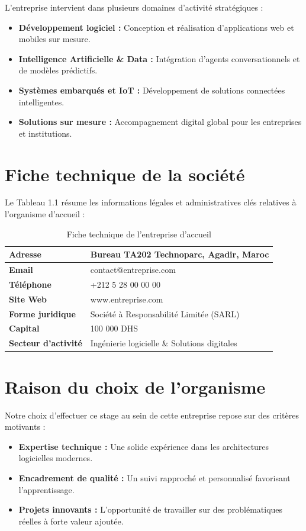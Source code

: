 \documentclass[12pt, a4paper, oneside]{report}
\begin{document}
L’entreprise intervient dans plusieurs domaines d'activité stratégiques :
\begin{itemize}
  \item \textbf{Développement logiciel :} Conception et réalisation d’applications web et mobiles sur mesure.
  \item \textbf{Intelligence Artificielle \& Data :} Intégration d'agents conversationnels et de modèles prédictifs.
  \item \textbf{Systèmes embarqués et IoT :} Développement de solutions connectées intelligentes.
  \item \textbf{Solutions sur mesure :} Accompagnement digital global pour les entreprises et institutions.
\end{itemize}

\section{Fiche technique de la société}
Le Tableau 1.1 résume les informations légales et administratives clés relatives à l'organisme d'accueil :

\begin{table}[H]
\centering
\caption{Fiche technique de l'entreprise d'accueil}
\renewcommand{\arraystretch}{1.3}
\begin{tabular}{|l|l|}
\hline
\textbf{Adresse} & Bureau TA202 Technoparc, Agadir, Maroc \\ \hline
\textbf{Email} & contact@entreprise.com \\ \hline
\textbf{Téléphone} & +212 5 28 00 00 00 \\ \hline
\textbf{Site Web} & www.entreprise.com \\ \hline
\textbf{Forme juridique} & Société à Responsabilité Limitée (SARL) \\ \hline
\textbf{Capital} & 100 000 DHS \\ \hline
\textbf{Secteur d'activité} & Ingénierie logicielle \& Solutions digitales \\ \hline
\end{tabular}
\end{table}

\section{Raison du choix de l'organisme}
Notre choix d’effectuer ce stage au sein de cette entreprise repose sur des critères motivants :
\begin{itemize}
  \item \textbf{Expertise technique :} Une solide expérience dans les architectures logicielles modernes.
  \item \textbf{Encadrement de qualité :} Un suivi rapproché et personnalisé favorisant l'apprentissage.
  \item \textbf{Projets innovants :} L'opportunité de travailler sur des problématiques réelles à forte valeur ajoutée.
\end{itemize}
\end{document}
